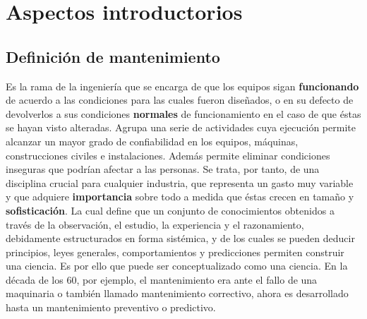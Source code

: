 \documentclass[
	12pt, %
	fleqn, %
	a4paper, %
]{LegrandOrangeBook}
\begin{document}
\chapter{Aspectos introductorios}
\section{Definición de mantenimiento}
Es la rama de la ingeniería que se encarga de que los equipos sigan \textbf{funcionando} de acuerdo a las condiciones para las cuales fueron diseñados, o en su defecto de devolverlos a sus condiciones \textbf{normales} de funcionamiento en el caso de que éstas se hayan visto alteradas. Agrupa una serie de actividades cuya ejecución permite alcanzar un mayor grado de confiabilidad en los equipos, máquinas, construcciones civiles e instalaciones. Además permite eliminar condiciones inseguras que podrían afectar a las personas. Se trata, por tanto, de una disciplina crucial para cualquier industria, que representa un gasto muy variable y que adquiere \textbf{importancia} sobre todo a medida que éstas crecen en tamaño y \textbf{sofisticación}. La cual define que un conjunto de conocimientos obtenidos a través de la observación, el estudio, la experiencia y el razonamiento, debidamente estructurados en forma sistémica, y de los cuales se pueden deducir principios, leyes generales, comportamientos y predicciones permiten construir una ciencia. Es por ello que puede ser conceptualizado como una ciencia. En la década de los 60, por ejemplo, el mantenimiento era ante el fallo de una maquinaria o también llamado mantenimiento correctivo, ahora es desarrollado hasta un mantenimiento preventivo o predictivo.
\end{document}
